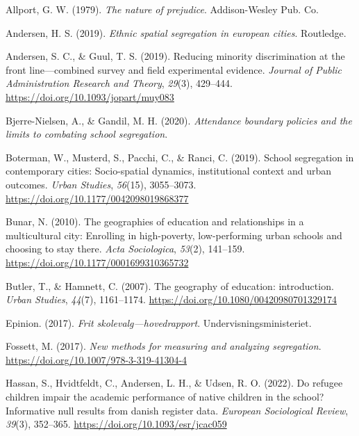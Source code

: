 \documentclass[
]{book}
\newlength{\cslhangindent}
\newenvironment{CSLReferences}[2] %
 {\begin{list}{}{%
  \setlength{\itemindent}{0pt}
  \setlength{\leftmargin}{0pt}
  \setlength{\parsep}{0pt}
  \ifodd #1
   \setlength{\leftmargin}{\cslhangindent}
   \setlength{\itemindent}{-1\cslhangindent}
  \fi
  \setlength{\itemsep}{#2\baselineskip}}}
 {\end{list}}
\begin{document}
\label{refs}
\begin{CSLReferences}{1}{0}
Allport, G. W. (1979). \emph{The nature of prejudice}. Addison-Wesley Pub. Co.

Andersen, H. S. (2019). \emph{Ethnic spatial segregation in european cities}. Routledge.

Andersen, S. C., \& Guul, T. S. (2019). Reducing minority discrimination at the front line---combined survey and field experimental evidence. \emph{Journal of Public Administration Research and Theory}, \emph{29}(3), 429--444. \url{https://doi.org/10.1093/jopart/muy083}

Bjerre-Nielsen, A., \& Gandil, M. H. (2020). \emph{Attendance boundary policies and the limits to combating school segregation}.

Boterman, W., Musterd, S., Pacchi, C., \& Ranci, C. (2019). School segregation in contemporary cities: Socio-spatial dynamics, institutional context and urban outcomes. \emph{Urban Studies}, \emph{56}(15), 3055--3073. \url{https://doi.org/10.1177/0042098019868377}

Bunar, N. (2010). The geographies of education and relationships in a multicultural city: Enrolling in high-poverty, low-performing urban schools and choosing to stay there. \emph{Acta Sociologica}, \emph{53}(2), 141--159. \url{https://doi.org/10.1177/0001699310365732}

Butler, T., \& Hamnett, C. (2007). The geography of education: introduction. \emph{Urban Studies}, \emph{44}(7), 1161--1174. \url{https://doi.org/10.1080/00420980701329174}

Epinion. (2017). \emph{Frit skolevalg---hovedrapport}. Undervisningsministeriet.

Fossett, M. (2017). \emph{New methods for measuring and analyzing segregation}. \url{https://doi.org/10.1007/978-3-319-41304-4}

Hassan, S., Hvidtfeldt, C., Andersen, L. H., \& Udsen, R. O. (2022). Do refugee children impair the academic performance of native children in the school? Informative null results from danish register data. \emph{European Sociological Review}, \emph{39}(3), 352--365. \url{https://doi.org/10.1093/esr/jcac059}


\end{CSLReferences}
\end{document}

